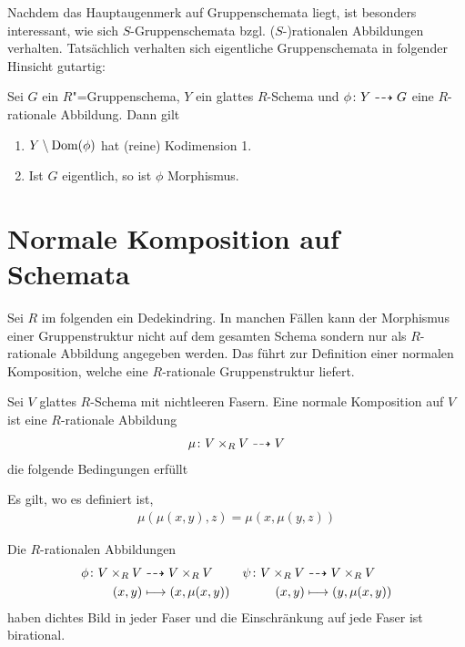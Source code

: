Nachdem das Hauptaugenmerk auf Gruppenschemata liegt, ist 
besonders interessant, wie sich $S$-Gruppenschemata
bzgl. ($S$-)rationalen Abbildungen verhalten.
Tatsächlich verhalten sich eigentliche Gruppenschemata in folgender
Hinsicht gutartig:
\begin{Lemma}
  \label{thm:rationalzumorphismus}
  Sei $G$ ein $R$"=Gruppenschema, $Y$ ein glattes $R$-Schema und
  $\phi\colon Y\dashrightarrow G$ eine $R$-rationale Abbildung.
  Dann gilt
  \begin{enumerate}[label=(\roman*)]
  \item $Y\setminus \operatorname{Dom}(\phi)$ hat (reine) Kodimension 1.
  \item Ist $G$ eigentlich, so ist $\phi$ Morphismus.
  \end{enumerate}
\end{Lemma}


\section{Normale Komposition auf Schemata}
Sei $R$ im folgenden ein Dedekindring.
In manchen Fällen kann der Morphismus einer Gruppenstruktur nicht auf
dem gesamten Schema sondern nur als $R$-rationale Abbildung angegeben
werden. Das führt zur Definition einer normalen Komposition, welche
eine $R$-rationale Gruppenstruktur liefert.
\begin{Definition}\label{def:normalekomposition}
  Sei $V$ glattes $R$-Schema mit nichtleeren Fasern.
  Eine normale Komposition auf $V$ ist eine $R$-rationale
  Abbildung
  \begin{gather*}
    \mu\colon V\times_R V\dashrightarrow V
  \end{gather*}
  die folgende Bedingungen erfüllt
  \begin{description}[font=\normalfont\itshape]
  \item[(Assoziativität)] Es gilt, wo es definiert ist,
    \begin{gather*}
      \mu(\mu(x,y),z)=\mu(x,\mu(y,z))
    \end{gather*}
  \item[(Inverses)]
    Die $R$-rationalen Abbildungen
    \begin{align*}
      \phi\colon V\times_R V
      &\dashrightarrow V\times_R V
      &\psi\colon V\times_R V
      & \dashrightarrow V\times_R V\\
      (x,y)
      &\longmapsto (x,\mu(x,y))
      &(x,y)
      &\longmapsto (y,\mu(x,y))       
    \end{align*}
    haben dichtes Bild in jeder Faser und die Einschränkung auf jede
    Faser ist birational.
  \end{description}
\end{Definition}

